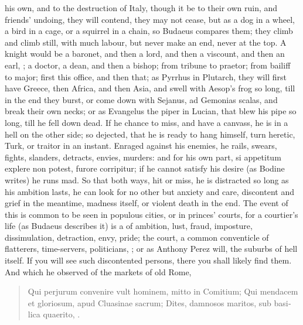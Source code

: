 {his own, and to the destruction of Italy, though it be to their own
ruin, and friends' undoing, they will contend, they may not cease, but
as a dog in a wheel, a bird in a cage, or a squirrel in a chain, so
Budaeus compares them; they climb and climb still, with
much labour, but never make an end, never at the top. A knight would be
a baronet, and then a lord, and then a viscount, and then an earl, \etc{};
a doctor, a dean, and then a bishop; from tribune to praetor; from
bailiff to major; first this office, and then that; as Pyrrhus in
Plutarch, they will first have Greece, then Africa, and then
Asia, and swell with Aesop's frog so long, till in the end they burst,
or come down with Sejanus, ad Gemonias scalas, and break their own
necks; or as Evangelus the piper in Lucian, that blew his pipe so long,
till he fell down dead. If he chance to miss, and have a canvass, he is
in a hell on the other side; so dejected, that he is ready to hang
himself, turn heretic, Turk, or traitor in an instant. Enraged against
his enemies, he rails, swears, fights, slanders, detracts, envies,
murders: and for his own part, si appetitum explere non potest, furore
corripitur; if he cannot satisfy his desire (as Bodine writes) he
runs mad. So that both ways, hit or miss, he is distracted so long as
his ambition lasts, he can look for no other but anxiety and care,
discontent and grief in the meantime, madness itself, or violent
death in the end. The event of this is common to be seen in populous
cities, or in princes' courts, for a courtier's life (as Budaeus
describes it) is a  of ambition, lust, fraud,
imposture, dissimulation, detraction, envy, pride; the court, a
common conventicle of flatterers, time-servers, politicians, \etc{}; or as
 Anthony Perez will, the suburbs of hell itself. If you will see
such discontented persons, there you shall likely find them. And
which he observed of the markets of old Rome,

\begin{latin}
\begin{quote}
Qui perjurum convenire vult hominem, mitto in Comitium;
Qui mendacem et gloriosum, apud Cluasinae sacrum;
Dites, damnosos maritos, sub basilica quaerito, \etc{}.
\end{quote}
\end{latin}

}
